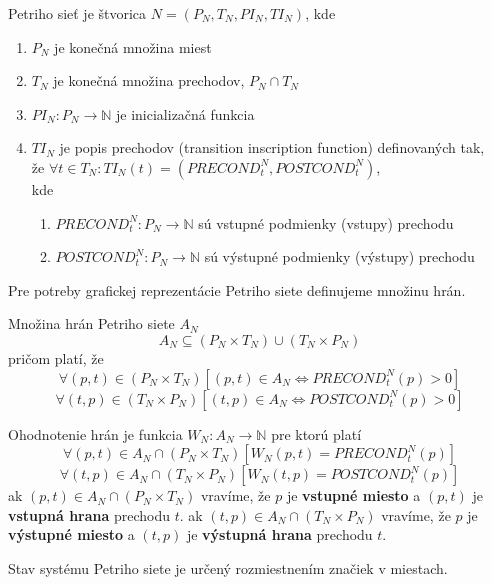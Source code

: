 \begin{defn} Petriho sieť je štvorica $N = (P_N, T_N, PI_N, TI_N)$, kde \begin{enumerate}
	\item $P_N$ je konečná množina miest
	\item $T_N$ je konečná množina prechodov, $P_N \cap T_N$
	\item $PI_N : P_N \longrightarrow  \mathbb{N}$ je inicializačná funkcia
	\item $TI_N$ je popis prechodov (transition inscription function) definovaných tak,\\
	\quad že $\forall t \in T_N : TI_N(t) = (PRECOND_t^N, POSTCOND_t^N)$,\\
	kde
	\begin{enumerate}
		\item $PRECOND_t^N : P_N \longrightarrow \mathbb{N}$ sú vstupné podmienky (vstupy) prechodu
		\item $POSTCOND_t^N : P_N \longrightarrow \mathbb{N}$ sú výstupné podmienky (výstupy) prechodu
	\end{enumerate}
\end{enumerate} \end{defn}

Pre potreby grafickej reprezentácie Petriho siete definujeme množinu hrán.

\begin{defn}
	Množina hrán Petriho siete $A_N$
	$$ A_N \subseteq (P_N \times T_N) \cup (T_N \times P_N)$$
	pričom platí, že
	$$ \forall (p,t) \in (P_N \times T_N) [(p,t) \in A_N \Longleftrightarrow PRECOND_t^N(p) > 0 ]$$
	$$ \forall (t,p) \in (T_N \times P_N) [(t,p) \in A_N \Longleftrightarrow POSTCOND_t^N(p) > 0 ]$$
\end{defn}

\begin{defn}
	Ohodnotenie hrán je funkcia $W_N : A_N \longrightarrow \mathbb{N}$ pre ktorú platí
	$$ \forall (p,t) \in A_N \cap (P_N \times T_N) [W_N(p,t) = PRECOND_t^N(p) ]$$
	$$ \forall (t,p) \in A_N \cap (T_N \times P_N) [W_N(t,p) =  POSTCOND_t^N(p)]$$
	ak $(p,t) \in A_N \cap (P_N \times T_N)$ vravíme, že $p$ je \textbf{vstupné miesto} a $(p,t)$ je \textbf{vstupná hrana} prechodu $t$. ak $(t,p) \in A_N \cap (T_N \times P_N)$ vravíme, že $p$ je \textbf{výstupné miesto} a $(t,p)$ je \textbf{výstupná hrana} prechodu $t$.
\end{defn}

Stav systému Petriho siete je určený rozmiestnením značiek v miestach.

